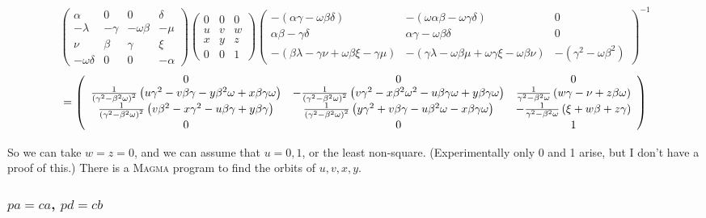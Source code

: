 \documentclass[10pt]{article}
\begin{document}
\[
\left( 
\begin{array}{cccc}
\alpha & 0 & 0 & \delta \\ 
-\lambda & -\gamma & -\omega \beta & -\mu \\ 
\nu & \beta & \gamma & \xi \\ 
-\omega \delta & 0 & 0 & -\alpha%
\end{array}%
\right) \left( 
\begin{array}{ccc}
0 & 0 & 0 \\ 
u & v & w \\ 
x & y & z \\ 
0 & 0 & 1%
\end{array}%
\right) \left( 
\begin{array}{ccc}
-(\alpha \gamma -\omega \beta \delta ) & -(\omega \alpha \beta -\omega
\gamma \delta ) & 0 \\ 
\alpha \beta -\gamma \delta & \alpha \gamma -\omega \beta \delta & 0 \\ 
-(\beta \lambda -\gamma \nu +\omega \beta \xi -\gamma \mu ) & -(\gamma
\lambda -\omega \beta \mu +\omega \gamma \xi -\omega \beta \nu ) & -(\gamma
^{2}-\omega \beta ^{2})%
\end{array}%
\right) ^{-1} 
\]
\[
=\left( 
\begin{array}{ccc}
0 & 0 & 0 \\ 
\frac{1}{\left( \gamma ^{2}-\beta ^{2}\omega \right) ^{2}}\left( u\gamma
^{2}-v\beta \gamma -y\beta ^{2}\omega +x\beta \gamma \omega \right) & -\frac{%
1}{\left( \gamma ^{2}-\beta ^{2}\omega \right) ^{2}}\left( v\gamma
^{2}-x\beta ^{2}\omega ^{2}-u\beta \gamma \omega +y\beta \gamma \omega
\right) & \frac{1}{\gamma ^{2}-\beta ^{2}\omega }\left( w\gamma -\nu +z\beta
\omega \right) \\ 
\frac{1}{\left( \gamma ^{2}-\beta ^{2}\omega \right) ^{2}}\left( v\beta
^{2}-x\gamma ^{2}-u\beta \gamma +y\beta \gamma \right) & \frac{1}{\left(
\gamma ^{2}-\beta ^{2}\omega \right) ^{2}}\left( y\gamma ^{2}+v\beta \gamma
-u\beta ^{2}\omega -x\beta \gamma \omega \right) & -\frac{1}{\gamma
^{2}-\beta ^{2}\omega }\left( \xi +w\beta +z\gamma \right) \\ 
0 & 0 & 1%
\end{array}%
\right) \allowbreak 
\]

So we can take $w=z=0$, and we can assume that $u=0,1$, or the least
non-square. (Experimentally only 0 and 1 arise, but I don't have a proof of
this.) There is a \textsc{Magma} program to find the orbits of $u,v,x,y$.

\subsubsection{$pa=ca$, $pd=cb$}
\end{document}
